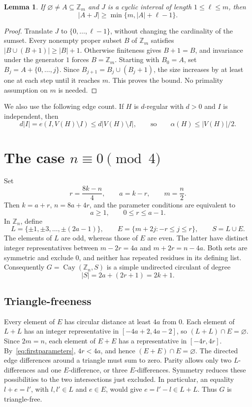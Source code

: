 \documentclass[11pt]{article}
\newtheorem{lemma}[theorem]{Lemma}
\newcommand{\Z}{\mathbb Z}
\newcommand{\Cay}{\operatorname{Cay}}
\begin{document}
\begin{lemma}\label{lem:interval}
If \(\varnothing\ne A\subseteq\Z_m\) and \(J\) is a cyclic interval
of length \(1\le\ell\le m\), then
\[
|A+J|\ge\min\{m,|A|+\ell-1\}.
\]
\end{lemma}
\begin{proof}
Translate \(J\) to \(\{0,\ldots,\ell-1\}\), without changing the
cardinality of the sumset. Every nonempty proper subset \(B\) of \(\Z_m\)
satisfies \(|B\cup(B+1)|\ge|B|+1\).
Otherwise finiteness gives \(B+1=B\), and invariance under the generator
\(1\) forces \(B=\Z_m\).
Starting with \(B_0=A\), set \(B_j=A+\{0,\ldots,j\}\).
Since \(B_{j+1}=B_j\cup(B_j+1)\), the size increases by at least one
at each step until it reaches \(m\). This proves the bound.
No primality assumption on \(m\) is needed.
\end{proof}

We also use the following edge count. If \(H\) is \(d\)-regular with \(d>0\)
and \(I\) is independent, then
\[
d|I|=e(I,V(H)\setminus I)\le d|V(H)\setminus I|,
\qquad\text{so}\qquad \alpha(H)\le |V(H)|/2.
\tag{1}\label{eq:regular}
\]

\section{\texorpdfstring{The case \(n\equiv0\pmod4\)}{The case n congruent to 0 modulo 4}}

Set
\[
r=\frac{8k-n}{4},\qquad a=k-r,\qquad m=\frac n2.
\]
Then \(k=a+r\), \(n=8a+4r\), and the parameter conditions are equivalent to
\[
a\ge1,\qquad 0\le r\le a-1.
\tag{2}\label{eq:firstparameters}
\]
In \(\Z_n\), define
\[
L=\{\pm1,\pm3,\ldots,\pm(2a-1)\},\qquad
E=\{m+2j:-r\le j\le r\},\qquad S=L\cup E.
\tag{3}\label{eq:firstset}
\]
The elements of \(L\) are odd, whereas those of \(E\) are even.
The latter have distinct integer representatives between
\(m-2r=4a\) and \(m+2r=n-4a\).
Both sets are symmetric and exclude \(0\), and neither has repeated
residues in its defining list.
Consequently \(G=\Cay(\Z_n,S)\) is a simple undirected circulant of degree
\[
|S|=2a+(2r+1)=2k+1.
\]

\subsection*{Triangle-freeness}

Every element of \(E\) has circular distance at least \(4a\) from \(0\).
Each element of \(L+L\) has an integer representative in
\([-4a+2,4a-2]\), so \((L+L)\cap E=\varnothing\).
Since \(2m=n\), each element of \(E+E\) has a representative in
\([-4r,4r]\). By~\eqref{eq:firstparameters}, \(4r<4a\), and hence
\((E+E)\cap E=\varnothing\).
The directed edge differences around a triangle must sum to zero.
Parity allows only two \(L\)-differences and one \(E\)-difference,
or three \(E\)-differences. Symmetry reduces these possibilities to the
two intersections just excluded. In particular, an equality
\(l+e=l'\), with \(l,l'\in L\) and \(e\in E\), would give
\(e=l'-l\in L+L\).
Thus \(G\) is triangle-free.
\end{document}
